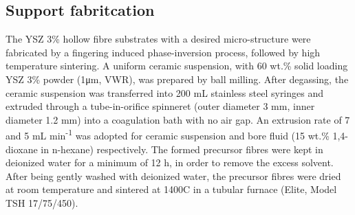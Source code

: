 \subsection{Support fabritcation}
The YSZ 3\% hollow fibre substrates with a desired micro-structure were fabricated by a fingering induced phase-inversion process, followed by high temperature sintering. A uniform ceramic suspension, with 60 wt.\% solid loading YSZ 3\% powder (1μm, VWR), was prepared by ball milling. After degassing, the ceramic suspension was transferred into 200 mL stainless steel syringes and extruded through a tube-in-orifice spinneret (outer diameter 3 mm, inner diameter 1.2 mm) into a coagulation bath with no air gap. An extrusion rate of 7 and 5 mL min\textsuperscript{-1} was adopted for ceramic suspension and bore fluid (15 wt.\% 1,4- dioxane in n-hexane) respectively. The formed precursor fibres were kept in deionized water for a minimum of 12 h, in order to remove the excess solvent. After being gently washed with deionized water, the precursor fibres were dried at room temperature and sintered at 1400\textdegree C in a tubular furnace (Elite, Model TSH 17/75/450).


